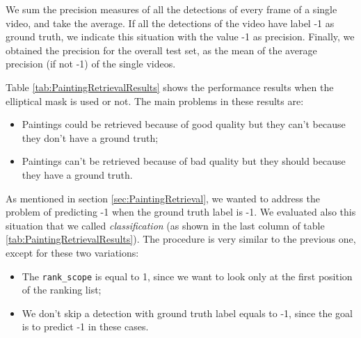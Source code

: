 \documentclass[10pt,twocolumn,letterpaper]{article}
\begin{document}
We sum the precision measures of all the detections of every frame of a single video, and take the average. If all the detections of the video have label -1 as ground truth, we indicate this situation with the value -1 as precision. Finally, we obtained the precision for the overall test set, as the mean of the average precision (if not -1) of the single videos.

Table \ref{tab:PaintingRetrievalResults} shows the performance results when the elliptical mask is used or not. The main problems in these results are:
\begin{itemize}
    \item Paintings could be retrieved because of good quality but they can't because they don't have a ground truth;
    \item Paintings can't be retrieved because of bad quality but they should because they have a ground truth.
\end{itemize}

As mentioned in section \ref{sec:PaintingRetrieval}, we wanted to address the problem of predicting -1 when the ground truth label is -1. We evaluated also this situation that we called \textit{classification} (as shown in the last column of table \ref{tab:PaintingRetrievalResults}). The procedure is very similar to the previous one, except for these two variations:
\begin{itemize}
    \item The \texttt{rank\_scope} is equal to 1, since we want to look only at the first position of the ranking list;
    \item We don't skip a detection with ground truth label equals to -1, since the goal is to predict -1 in these cases.
\end{itemize}
\end{document}
